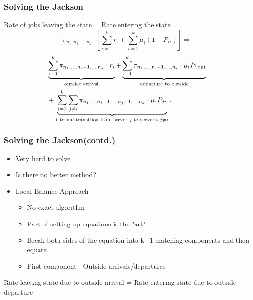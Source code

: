 \documentclass[10pt,notes]{beamer}
\begin{document}
\begin{frame}
    \frametitle{Solving the Jackson}
    \begin{center} 
    \linespread{1.6}
        Rate of jobs leaving the state = Rate entering the state
   \[
\pi_{n_1,n_2,\ldots,n_k} \cdot \left[ \sum_{i=1}^{k} r_i + \sum_{i=1}^{k} \mu_i (1 - P_{ii})  \right] = 
\]
        \begin{equation}
\begin{aligned}
    \notag
    &\underbrace{\sum_{i=1}^{k} \pi_{n_1,\ldots,n_i - 1,\ldots,n_k} \cdot r_i}_{\text{outside arrival}}
    + \underbrace{\sum_{i=1}^{k} \pi_{n_1,\ldots,n_i + 1,\ldots,n_k} \cdot \mu_i P_{i,\text{out}}}_{\text{departure to outside}} \\
    &+ \underbrace{\sum_{i=1}^{k} \sum_{j \neq i} \pi_{n_1,\ldots,n_i - 1,\ldots,n_j + 1,\ldots,n_k} \cdot \mu_j P_{ji}}_{\text{internal transition from server } j \text{ to server } i, j \neq i}.
\end{aligned}
\end{equation}

        
    \end{center}
    

\end{frame}

\begin{frame}
    \frametitle{Solving the Jackson(contd.)}
    \begin{itemize}
        \item Very hard to solve
        \item Is there no better method?
        \item Local Balance Approach
        \begin{itemize}
            \item No exact algorithm
            \item Part of setting up equations is the "art"
            \item Break both sides of the equation into k+1 matching components and then equate
            \item First component - Outside arrivals/departures
        \end{itemize}
    \end{itemize}
    \begin{center} 
    Rate leaving state due to outside arrival =
    Rate entering state due to outside departure 
                
    \end{center}
    
\end{frame}
\end{document}
